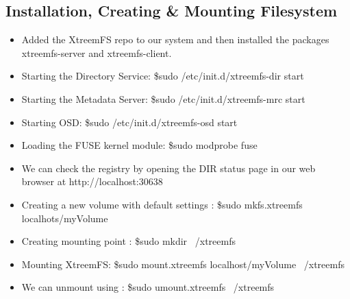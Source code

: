 \documentclass[12pt]{report}
\begin{document}
\subsection{Installation, Creating \& Mounting Filesystem}
\begin{itemize}
\item Added the XtreemFS repo to our system and then installed the packages xtreemfs-server and xtreemfs-client.
\item Starting the Directory Service: \$sudo /etc/init.d/xtreemfs-dir start 
\item Starting the Metadata Server: \$sudo /etc/init.d/xtreemfs-mrc start
\item Starting OSD: \$sudo /etc/init.d/xtreemfs-osd start
\item Loading the FUSE kernel module: \$sudo modprobe fuse
\item We can check the registry by opening the DIR status page in our web browser at http://localhost:30638
\item Creating a new volume with default settings : \$sudo mkfs.xtreemfs localhots/myVolume
\item Creating mounting point : \$sudo mkdir ~/xtreemfs
\item Mounting XtreemFS: \$sudo mount.xtreemfs localhost/myVolume ~/xtreemfs
\item We can unmount using : \$sudo umount.xtreemfs ~/xtreemfs
\end{itemize}
\end{document}
